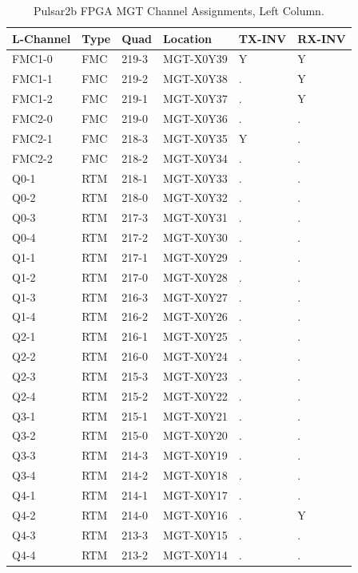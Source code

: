 \documentclass[letterpaper]{article}
\begin{document}
\begin{table}[htp]
\centering
\caption{Pulsar2b FPGA MGT Channel Assignments, Left Column.}
\begin{tabular}{|l|l|l|l|l|l|} \hline
L-Channel & Type & Quad & Location & TX-INV & RX-INV \\ \hline
FMC1-0 & FMC & 219-3 & MGT-X0Y39 & Y & Y \\ \hline
FMC1-1 & FMC & 219-2 & MGT-X0Y38 & . & Y \\ \hline
FMC1-2 & FMC & 219-1 & MGT-X0Y37 & . & Y \\ \hline
FMC2-0 & FMC & 219-0 & MGT-X0Y36 & . & . \\ \hline
FMC2-1 & FMC & 218-3 & MGT-X0Y35 & Y & . \\ \hline
FMC2-2 & FMC & 218-2 & MGT-X0Y34 & . & . \\ \hline
Q0-1 & RTM & 218-1 & MGT-X0Y33 & . & . \\ \hline
Q0-2 & RTM & 218-0 & MGT-X0Y32 & . & . \\ \hline
Q0-3 & RTM & 217-3 & MGT-X0Y31 & . & . \\ \hline
Q0-4 & RTM & 217-2 & MGT-X0Y30 & . & . \\ \hline
Q1-1 & RTM & 217-1 & MGT-X0Y29 & . & . \\ \hline
Q1-2 & RTM & 217-0 & MGT-X0Y28 & . & . \\ \hline
Q1-3 & RTM & 216-3 & MGT-X0Y27 & . & . \\ \hline
Q1-4 & RTM & 216-2 & MGT-X0Y26 & . & . \\ \hline
Q2-1 & RTM & 216-1 & MGT-X0Y25 & . & . \\ \hline
Q2-2 & RTM & 216-0 & MGT-X0Y24 & . & . \\ \hline
Q2-3 & RTM & 215-3 & MGT-X0Y23 & . & . \\ \hline
Q2-4 & RTM & 215-2 & MGT-X0Y22 & . & . \\ \hline
Q3-1 & RTM & 215-1 & MGT-X0Y21 & . & . \\ \hline
Q3-2 & RTM & 215-0 & MGT-X0Y20 & . & . \\ \hline \hline
Q3-3 & RTM & 214-3 & MGT-X0Y19 & . & . \\ \hline
Q3-4 & RTM & 214-2 & MGT-X0Y18 & . & . \\ \hline
Q4-1 & RTM & 214-1 & MGT-X0Y17 & . & . \\ \hline
Q4-2 & RTM & 214-0 & MGT-X0Y16 & . & Y \\ \hline
Q4-3 & RTM & 213-3 & MGT-X0Y15 & . & . \\ \hline
Q4-4 & RTM & 213-2 & MGT-X0Y14 & . & . \\ \hline

\end{tabular}
\end{table}
\end{document}
